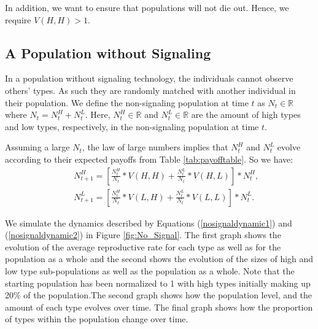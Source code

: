 In addition, we want to ensure that populations will not die out. Hence, we require $V(H,H)>1$.

\subsection{A Population without Signaling}

In a population without signaling technology, the  individuals cannot observe others' types. As such they are randomly matched with another individual in their population. We define the non-signaling population at time $t$ as $N_t \in \mathbb{R}$ where $N_t = N^H_t + N^L_t$. Here, $N^H_t \in \mathbb{R}$ and $N^L_t \in \mathbb{R}$ are the amount of high types and low types, respectively, in the non-signaling population at time $t$.

Assuming a large $N_t$, the law of large numbers implies that $N^H_t$ and $N^L_t$ evolve according to their expected payoffs from Table \ref{tab:payofftable}. So we have: 
\begin{eqnarray}
    && N^H_{t+1}=[\frac{N^H_t}{N_t}*V(H,H)+\frac{N^L_t}{N_t}*V(H,L)]*N^H_t, \label{nosignaldynamic1}\\
    && N^L_{t+1}=[\frac{N^H_t}{N_t}*V(L,H)+\frac{N^L_t}{N_t}*V(L,L)]*N^L_t.\label{nosignaldynamic2}
\end{eqnarray}

We simulate the dynamics described by Equations (\ref{nosignaldynamic1}) and (\ref{nosignaldynamic2}) in Figure \ref{fig:No_Signal}. The first graph shows the evolution of the average reproductive rate for each type as well as for the population as a whole and the second shows the evolution of the sizes of high and low type sub-populations as well as the population as a whole. Note that the starting population has been normalized to 1 with high types initially making up 20\% of the population.The second graph shows how the population level, and the amount of each type evolves over time. The final graph shows how the proportion of types within the population change over time.

